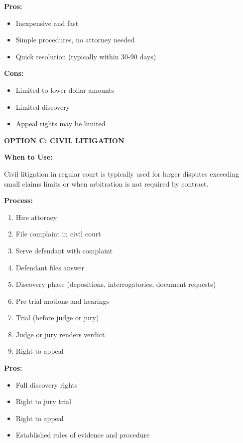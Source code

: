 \documentclass[11pt,letterpaper]{article}
\begin{document}
\vspace{6pt}

\textbf{Pros:}
\begin{itemize}[leftmargin=0.75in]
\item Inexpensive and fast
\item Simple procedures, no attorney needed
\item Quick resolution (typically within 30-90 days)
\end{itemize}

\textbf{Cons:}
\begin{itemize}[leftmargin=0.75in]
\item Limited to lower dollar amounts
\item Limited discovery
\item Appeal rights may be limited
\end{itemize}

\vspace{6pt}

\textbf{OPTION C: CIVIL LITIGATION}

\textbf{When to Use:}

Civil litigation in regular court is typically used for larger disputes exceeding small claims limits or when arbitration is not required by contract.

\vspace{6pt}

\textbf{Process:}

\begin{enumerate}
\item Hire attorney
\item File complaint in civil court
\item Serve defendant with complaint
\item Defendant files answer
\item Discovery phase (depositions, interrogatories, document requests)
\item Pre-trial motions and hearings
\item Trial (before judge or jury)
\item Judge or jury renders verdict
\item Right to appeal
\end{enumerate}

\vspace{6pt}

\textbf{Pros:}
\begin{itemize}[leftmargin=0.75in]
\item Full discovery rights
\item Right to jury trial
\item Right to appeal
\item Established rules of evidence and procedure
\end{itemize}
\end{document}
